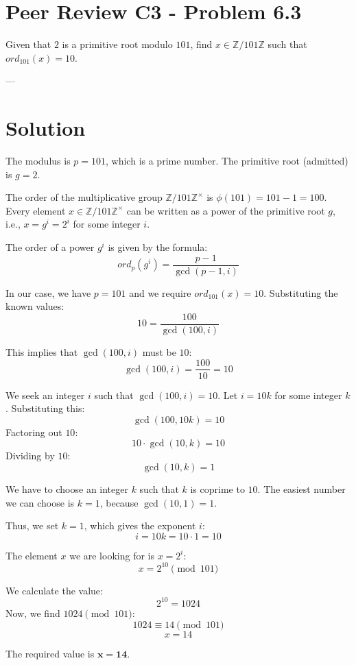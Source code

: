 \documentclass[a4paper,12pt]{article}
\begin{document}
\section*{Peer Review C3 - Problem 6.3}

Given that $2$ is a primitive root modulo $101$, find $x \in \mathbb{Z}/101\mathbb{Z}$ such that $ord_{101}(x)=10$.

---

\section*{Solution}

The modulus is $p=101$, which is a prime number.
The primitive root (admitted) is $g=2$.

The order of the multiplicative group $\mathbb{Z}/101\mathbb{Z}^{\times}$ is $\phi(101) = 101-1 = 100$.
Every element $x \in \mathbb{Z}/101\mathbb{Z}^{\times}$ can be written as a power of the primitive root $g$, i.e., $x = g^i = 2^i$ for some integer $i$.

The order of a power $g^i$ is given by the formula:
$$ord_{p}(g^{i})=\frac{p-1}{\gcd(p-1,i)}$$

In our case, we have $p=101$ and we require $ord_{101}(x)=10$. Substituting the known values:
$$10 = \frac{100}{\gcd(100,i)}$$

This implies that $\gcd(100,i)$ must be $10$:
$$\gcd(100,i) = \frac{100}{10} = 10$$

We seek an integer $i$ such that $\gcd(100, i) = 10$.
Let $i = 10k$ for some integer $k$. Substituting this:
$$\gcd(100, 10k) = 10$$
Factoring out $10$:
$$10 \cdot \gcd(10, k) = 10$$
Dividing by $10$:
$$\gcd(10, k) = 1$$

We have to choose an integer $k$ such that $k$ is coprime to $10$. The easiest number we can choose is $k=1$, because $\gcd(10, 1) = 1$.

Thus, we set $k=1$, which gives the exponent $i$:
$$i = 10k = 10 \cdot 1 = 10$$

The element $x$ we are looking for is $x = 2^i$:
$$x = 2^{10} \pmod{101}$$

We calculate the value:
$$2^{10} = 1024$$
Now, we find $1024 \pmod{101}$:
$$1024 \equiv 14 \pmod{101}$$
$$x=14$$

The required value is $\mathbf{x=14}$.
\end{document}
